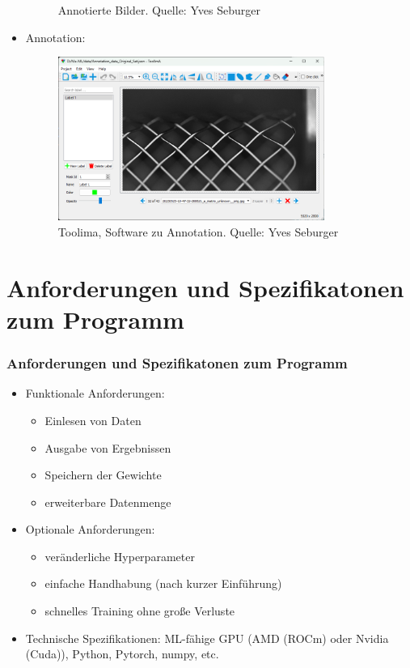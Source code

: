 \documentclass{beamer}
\begin{document}
\begin{frame}[allowframebreaks]
\begin{itemize}
\begin{figure}
            \caption{Annotierte Bilder. \scriptsize{Quelle: Yves Seburger}}
        \end{figure} 
        \framebreak
    \item Annotation:
    \begin{figure}
        \includegraphics[width=8.7cm]{Bilder/toolima.png}
        \caption{Toolima, Software zu Annotation. \scriptsize{Quelle: Yves Seburger}}
    \end{figure} 
\end{itemize}
\end{frame}

\section{Anforderungen und Spezifikatonen zum Programm}
\begin{frame}
    \frametitle{Anforderungen und Spezifikatonen zum Programm}
    \begin{itemize}
        \item Funktionale Anforderungen:
            \begin{itemize}
                \item Einlesen von Daten
                \item Ausgabe von Ergebnissen
                \item Speichern der Gewichte
                \item erweiterbare Datenmenge
            \end{itemize}
        \item Optionale Anforderungen:
            \begin{itemize}
                \item veränderliche Hyperparameter
                \item einfache Handhabung (nach kurzer Einführung)
                \item schnelles Training ohne große Verluste
            \end{itemize}
        \item Technische Spezifikationen: 
        ML-fähige GPU (AMD (ROCm) oder Nvidia (Cuda)), 
        Python, Pytorch, numpy, etc.
    \end{itemize}
\end{frame}
\end{document}
